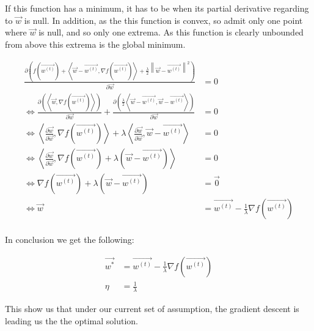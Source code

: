 
If this function has a minimum, it has to be when its partial derivative regarding to $\vec{w}$ is null.
In addition, as the this function is convex, so admit only one point where $\vec{w}$ is null, and so only one extrema.
As this function is clearly unbounded from above this extrema is the global minimum.

\begin{align*}
    \frac{\partial \left( f\left( \vec{w^{(t)}} \right) +
                           \left< \vec{w} - \vec{w^{(t)}}, \nabla f\left( \vec{w^{(t)}} \right) \right>
                           + \frac{\lambda}{2} \left\| \vec{w} - \vec{w^{(t)}} \right\|^2 \right)
    }{
        \partial \vec{w}
    }
    &= 0 \\
    \Leftrightarrow
    \frac{\partial \left(
                           \left< \vec{w}, \nabla f\left( \vec{w^{(t)}} \right) \right> \right) }
    {\partial \vec{w}} +
    \frac{\partial \left( \frac{\lambda}{2} \left< \vec{w} - \vec{w^{(t)}}, \vec{w} - \vec{w^{(t)}} \right> \right) }
    {\partial \vec{w}}
    &= 0 \\
    \Leftrightarrow
    \left< \frac{\partial\vec{w}}{\partial\vec{w}}, \nabla f\left( \vec{w^{(t)}} \right) \right> +
    \lambda \left< \frac{\partial\vec{w}}{\partial\vec{w}}, \vec{w} - \vec{w^{(t)}} \right>
    &= 0 \\
    \Leftrightarrow
    \left< \frac{\partial\vec{w}}{\partial\vec{w}}, \nabla f\left( \vec{w^{(t)}} \right) + \lambda \left( \vec{w} - \vec{w^{(t)}} \right) \right>
    &= 0 \\
    \Leftrightarrow
    \nabla f\left( \vec{w^{(t)}} \right) + \lambda \left( \vec{w} - \vec{w^{(t)}} \right)
    &= \vec{0} \\
    \Leftrightarrow
    \vec{w}
    &= \vec{w^{(t)}} - \frac{1}{\lambda} \nabla f\left( \vec{w^{(t)}} \right) \\
\end{align*}

In conclusion we get the following:

\begin{align*}
    \vec{w^*} &= \vec{w^{(t)}} - \frac{1}{\lambda} \nabla f\left( \vec{w^{(t)}} \right) \\
    \eta &= \frac{1}{\lambda}
\end{align*}

This show us that under our current set of assumption, the gradient descent is leading us the the optimal solution.
